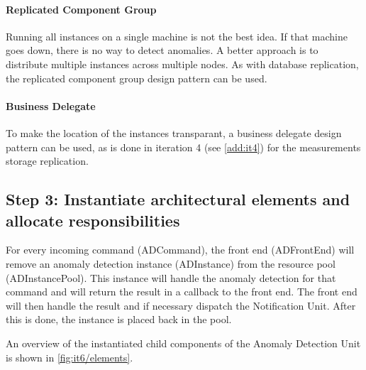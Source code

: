 \paragraph{Replicated Component Group}

\npar Running all instances on a single machine is not the best idea. If that
machine goes down, there is no way to detect anomalies. A better approach is to
distribute multiple instances across multiple nodes. As with database
replication, the replicated component group design pattern
\citep[see][p.~326]{Buschmann:07} can be used.

\paragraph{Business Delegate}

\npar To make the location of the instances transparant, a business delegate
design pattern \citep[see][p.~292]{Buschmann:07} can be used, as is done in
iteration 4 (see \ref{add:it4}) for the measurements storage replication.

\subsection{Step 3: Instantiate architectural elements and allocate responsibilities}
\label{add:it6/elements}

\npar For every incoming command (ADCommand), the front end (ADFrontEnd) will
remove an anomaly detection instance (ADInstance) from the resource pool
(ADInstancePool). This instance will handle the anomaly detection for that
command and will return the result in a callback to the front end. The front end
will then handle the result and if necessary dispatch the Notification Unit.
After this is done, the instance is placed back in the pool.

\npar An overview of the instantiated child components of the Anomaly Detection
Unit is shown in \ref{fig:it6/elements}.

